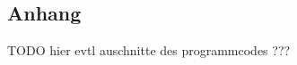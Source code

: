 \begin{appendix}

\chapter{Anhang}

TODO hier evtl auschnitte des programmcodes ???


\end{appendix}
